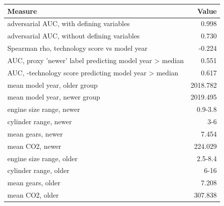 \begin{tabular}{lr}
\toprule
Measure & Value \\
\midrule
adversarial AUC, with defining variables & 0.998 \\
adversarial AUC, without defining variables & 0.730 \\
Spearman rho, technology score vs model year & -0.224 \\
AUC, proxy 'newer' label predicting model year > median & 0.551 \\
AUC, -technology score predicting model year > median & 0.617 \\
mean model year, older group & 2018.782 \\
mean model year, newer group & 2019.495 \\
engine size range, newer & 0.9-3.8 \\
cylinder range, newer & 3-6 \\
mean gears, newer & 7.454 \\
mean CO2, newer & 224.029 \\
engine size range, older & 2.5-8.4 \\
cylinder range, older & 6-16 \\
mean gears, older & 7.208 \\
mean CO2, older & 307.838 \\
\bottomrule
\end{tabular}
